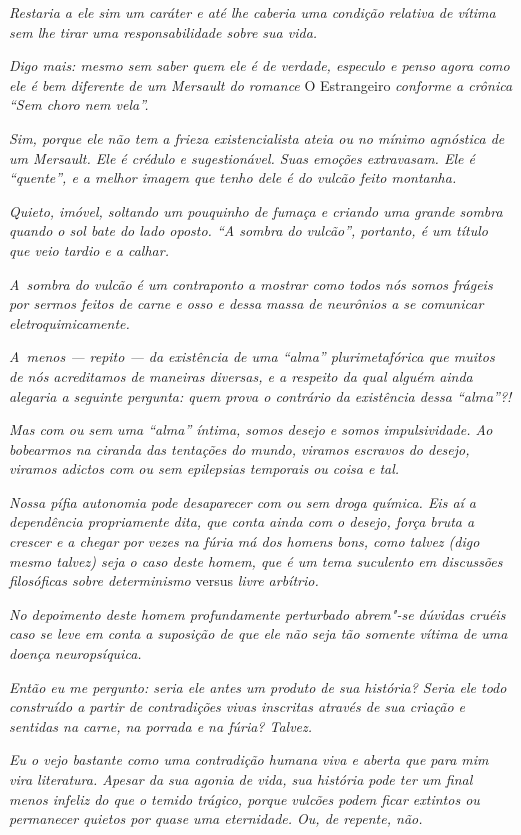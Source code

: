 \emph{Restaria a ele sim um caráter e até lhe caberia uma condição
relativa de vítima sem lhe tirar uma responsabilidade sobre sua vida.}

\emph{Digo mais: mesmo sem saber quem ele é de verdade, especulo e penso
agora como ele é bem diferente de um Mersault do romance} O Estrangeiro \emph{conforme a crônica ``Sem choro nem vela''.}

\emph{Sim, porque ele não tem a frieza existencialista ateia ou no
mínimo agnóstica de um Mersault. Ele é crédulo e sugestionável. Suas
emoções extravasam. Ele é ``quente'', e a melhor imagem que tenho dele é
do vulcão feito montanha.}

\emph{Quieto, imóvel, soltando um pouquinho de fumaça e criando uma
grande sombra quando o sol bate do lado oposto. ``A sombra do vulcão'',
portanto, é um título que veio tardio e a calhar.}

\emph{A~sombra do vulcão é um contraponto a mostrar como todos nós somos
frágeis por sermos feitos de carne e osso e dessa massa de neurônios a
se comunicar eletroquimicamente.}

\emph{A~menos --- repito --- da existência de uma ``alma''
plurimetafórica que muitos de nós acreditamos de maneiras diversas, e a
respeito da qual alguém ainda alegaria a seguinte pergunta: quem prova o
contrário da existência dessa ``alma''?!}

\emph{Mas com ou sem uma ``alma'' íntima, somos desejo e somos
impulsividade. Ao bobearmos na ciranda das tentações do mundo, viramos
escravos do desejo, viramos adictos com ou sem epilepsias temporais ou
coisa e tal.}

\emph{Nossa pífia autonomia pode desaparecer com ou sem droga química.
Eis aí a dependência propriamente dita, que conta ainda com o desejo,
força bruta a crescer e a chegar por vezes na fúria má dos homens bons,
como talvez (digo mesmo talvez) seja o caso deste homem, que é um tema
suculento em discussões filosóficas sobre determinismo} versus \emph{livre
arbítrio.}

\emph{No depoimento deste homem profundamente perturbado abrem"-se
dúvidas cruéis caso se leve em conta a suposição de que ele não seja tão
somente vítima de uma doença neuropsíquica.}

\emph{Então eu me pergunto: seria ele antes um produto de sua história?
Seria ele todo construído a partir de contradições vivas inscritas
através de sua criação e sentidas na carne, na porrada e na fúria?
Talvez.}

\emph{Eu o vejo bastante como uma contradição humana viva e aberta que
para mim vira literatura. Apesar da sua agonia de vida, sua história
pode ter um final menos infeliz do que o temido trágico, porque vulcões
podem ficar extintos ou permanecer quietos por quase uma eternidade. Ou,
de repente, não.}
\endgroup